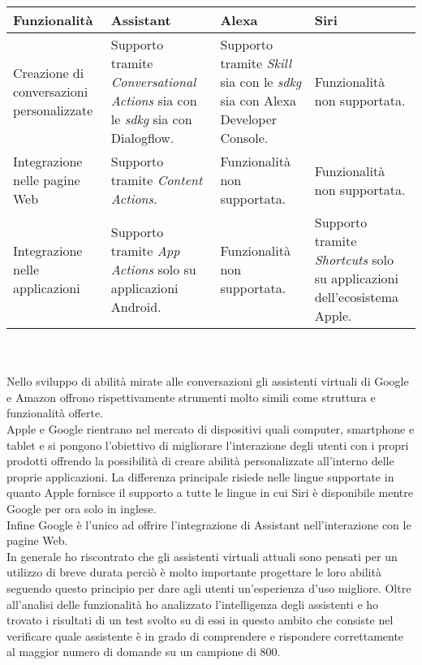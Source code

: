 \begin{tabularx}{\textwidth}{|X|X|X|X|}
	\hline
	\textbf{Funzionalità} & \textbf{Assistant} & \textbf{Alexa} & \textbf{Siri} \\\hline
	
	Creazione di conversazioni personalizzate & Supporto tramite \emph{Conversational Actions} sia con le \emph{\gls{sdkg}} sia con Dialogflow.  & Supporto tramite \emph{Skill} sia con le \emph{\gls{sdkg}} sia con Alexa Developer Console. & Funzionalità non supportata. \\
	\hline
	Integrazione nelle pagine Web & Supporto tramite \emph{Content Actions}. & Funzionalità non supportata. & Funzionalità non supportata. \\
	\hline
	Integrazione nelle applicazioni & Supporto tramite \emph{App Actions} solo su applicazioni Android. & Funzionalità non supportata. & Supporto tramite \emph{Shortcuts} solo su applicazioni dell'ecosistema Apple. \\
	\hline
\end{tabularx}
\\ \\

Nello sviluppo di abilità mirate alle conversazioni gli assistenti virtuali di Google e Amazon offrono rispettivamente strumenti molto simili come struttura e funzionalità offerte. \\
Apple e Google rientrano nel mercato di dispositivi quali computer, smartphone e tablet e si pongono l'obiettivo di migliorare l’interazione degli utenti con i propri prodotti offrendo la possibilità di creare abilità personalizzate all'interno delle proprie applicazioni. La differenza principale risiede nelle lingue supportate in quanto Apple fornisce il supporto a tutte le lingue in cui Siri è disponibile mentre Google per ora solo in inglese. \\
Infine Google è l'unico ad offrire l'integrazione di Assistant nell'interazione con le pagine Web. \\
In generale ho riscontrato che gli assistenti virtuali attuali sono pensati per un utilizzo di breve durata perciò è molto importante progettare le loro abilità seguendo questo principio per dare agli utenti un'esperienza d'uso migliore.
Oltre all'analisi delle funzionalità ho analizzato l'intelligenza degli assistenti e ho trovato i risultati di un test svolto su di essi in questo ambito che consiste nel verificare quale assistente è in grado di comprendere e rispondere correttamente al maggior numero di domande su un campione di 800.
\pagebreak

